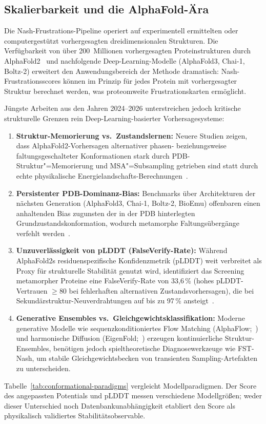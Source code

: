 \documentclass[12pt,a4paper]{article}
\theoremstyle{remark}
\begin{document}
\subsection{Skalierbarkeit und die AlphaFold-Ära}
\label{sec:alphafold-scalability}

Die Nash-Frustrations-Pipeline operiert auf experimentell ermittelten oder computergestützt vorhergesagten dreidimensionalen Strukturen. Die Verfügbarkeit von über 200~Millionen vorhergesagten Proteinstrukturen durch AlphaFold2~\citep{JumperAF2021} und nachfolgende Deep-Learning-Modelle (AlphaFold3, Chai-1, Boltz-2) erweitert den Anwendungsbereich der Methode dramatisch: Nash-Frustrationsscores können im Prinzip für jedes Protein mit vorhergesagter Struktur berechnet werden, was proteomweite Frustrationskarten ermöglicht.

Jüngste Arbeiten aus den Jahren 2024--2026 unterstreichen jedoch kritische strukturelle Grenzen rein Deep-Learning-basierter Vorhersagesysteme:
\begin{enumerate}
    \item \textbf{Struktur-Memorierung vs.\ Zustandslernen:} Neuere Studien zeigen, dass AlphaFold2-Vorhersagen alternativer phasen- beziehungsweise faltungsgeschalteter Konformationen stark durch PDB-Struktur"=Me\-mo\-rie\-rung und MSA"=Sub\-sam\-pling getrieben sind statt durch echte physikalische Energielandschafts-Berechnungen~\citep{NatureComms2024}.
    \item \textbf{Persistenter PDB-Dominanz-Bias:} Benchmarks über Architekturen der nächsten Generation (AlphaFold3, Chai-1, Boltz-2, BioEmu) offenbaren einen anhaltenden Bias zugunsten der in der PDB hinterlegten Grundzustandskonformation, wodurch metamorphe Faltungsübergänge verfehlt werden~\citep{Ye2026}.
    \item \textbf{Unzuverlässigkeit von pLDDT (\glqq FalseVerify\grqq{}-Rate):} Während AlphaFold2s residuenspezifische Konfidenzmetrik (pLDDT) weit verbreitet als Proxy für strukturelle Stabilität genutzt wird, identifiziert das Screening metamorpher Proteine eine \glqq FalseVerify\grqq{}-Rate von 33{,}6\,\% (hohes pLDDT-Vertrauen $\ge 80$ bei fehlerhaften alternativen Zustandsvorhersagen), die bei Sekundärstruktur-Neuverdrahtungen auf bis zu 97\,\% ansteigt~\citep{Thacker2026}.
    \item \textbf{Generative Ensembles vs.\ Gleichgewichtsklassifikation:} Moderne generative Modelle wie sequenzkonditioniertes Flow Matching (AlphaFlow;~\citealp{JingFlow2024}) und harmonische Diffusion (EigenFold;~\citealp{JingDiffusion2023}) erzeugen kontinuierliche Struktur-Ensembles, benötigen jedoch spieltheoretische Diagnosewerkzeuge wie FST-Nash, um stabile Gleichgewichtsbecken von transienten Sampling-Artefakten zu unterscheiden.
\end{enumerate}
Tabelle~\ref{tab:conformational-paradigms} vergleicht Modellparadigmen. Der Score des angepassten Potentials und pLDDT messen verschiedene Modellgrößen; weder dieser Unterschied noch Datenbankunabhängigkeit etabliert den Score als physikalisch validiertes Stabilitätsobservable.
\end{document}
